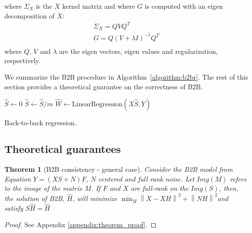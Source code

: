 \documentclass[preprint,12pt,3p]{elsarticle}
\newtheorem{theorem}{Theorem}
\begin{document}
where $\Sigma_X$ is the $X$ kernel matrix and where $G$ is computed with an
eigen decomposition of $X$:
\begin{equation}
  \begin{aligned}
  \Sigma_X = Q V Q^T \\
  G = Q (V + \lambda I)^{-1} Q^T\\
  \end{aligned}
\end{equation}
where $Q$, $V$ and $\lambda$ are the eigen vectors, eigen values and
regularization, respectively.

%

We summarize the B2B procedure in Algorithm~\ref{algorithm:b2br}.
%
The rest of this section provides a theoretical guarantee on the correctness of
B2B.


\begin{algorithm}[H]
    $\hat{S} \leftarrow 0$\;
    $\hat{S} \leftarrow \hat{S} / m$\;
    $\hat{W} \leftarrow \text{LinearRegression}(X \hat{S}, Y)$\;
    \caption{Back-to-back regression.}
    \label{algorithm:b2br}
\end{algorithm}

\subsection{Theoretical guarantees}
\label{sec:theorem}

\begin{theorem}[B2B consistency - general case]

     Consider the B2B model from Equation $Y = (XS + N)F$, $N$ centered and full
     rank noise.
     Let $Img(M)$ refers to the image of the matrix $M$. If $F$ and $X$ are
     full-rank on the $Img(S)$, then, the solution of B2B, $\hat H$, will
     minimize
     $\min_H  \left \| X - XH\right\| ^2  + \left \| NH\right \| ^2$and satisfy $S\hat H = \hat H$
\end{theorem}
%
\begin{proof}
  See Appendix \ref{appendix:theorem_proof}.
\end{proof}
\end{document}
